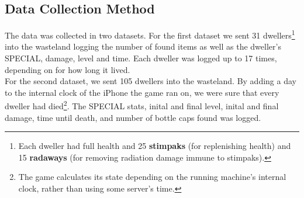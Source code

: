 \subsection{Data Collection Method}
The data was collected in two datasets. For the first dataset we sent 31 dwellers\footnote{Each dweller had full health and 25 \textbf{stimpaks} (for replenishing health) and 15 \textbf{radaways} (for removing radiation damage immune to stimpaks).} into the wasteland logging the number of found items as well as the dweller's SPECIAL, damage, level and time. Each dweller was logged up to 17 times, depending on for how long it lived.\\

For the second dataset, we sent 105 dwellers into the wasteland. By adding a day to the internal clock of the iPhone the game ran on, we were sure that every dweller had died\footnote{The game calculates its state depending on the running machine's internal clock, rather than using some server's time.}. The SPECIAL stats, inital and final level, inital and final damage, time until death, and number of bottle caps found was logged.
